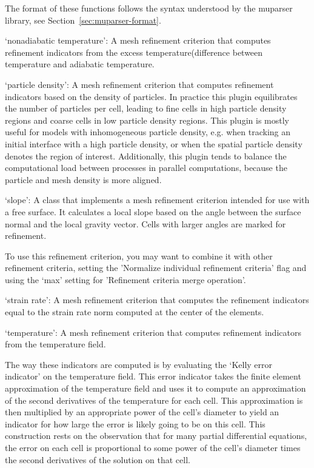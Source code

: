 \begin{itemize}
The format of these functions follows the syntax understood by the muparser library, see Section~\ref{sec:muparser-format}.

`nonadiabatic temperature': A mesh refinement criterion that computes refinement indicators from the excess temperature(difference between temperature and adiabatic temperature.

`particle density': A mesh refinement criterion that computes refinement indicators based on the density of particles. In practice this plugin equilibrates the number of particles per cell, leading to fine cells in high particle density regions and coarse cells in low particle density regions. This plugin is mostly useful for models with inhomogeneous particle density, e.g. when tracking an initial interface with a high particle density, or when the spatial particle density denotes the region of interest. Additionally, this plugin tends to balance the computational load between processes in parallel computations, because the particle and mesh density is more aligned.

`slope': A class that implements a mesh refinement criterion intended for use with a free surface. It calculates a local slope based on the angle between the surface normal and the local gravity vector. Cells with larger angles are marked for refinement.

To use this refinement criterion, you may want to combine it with other refinement criteria, setting the 'Normalize individual refinement criteria' flag and using the `max' setting for 'Refinement criteria merge operation'.

`strain rate': A mesh refinement criterion that computes the refinement indicators equal to the strain rate norm computed at the center of the elements.

`temperature': A mesh refinement criterion that computes refinement indicators from the temperature field.

The way these indicators are computed is by evaluating the `Kelly error indicator' on the temperature field. This error indicator takes the finite element approximation of the temperature field and uses it to compute an approximation of the second derivatives of the temperature for each cell. This approximation is then multiplied by an appropriate power of the cell's diameter to yield an indicator for how large the error is likely going to be on this cell. This construction rests on the observation that for many partial differential equations, the error on each cell is proportional to some power of the cell's diameter times the second derivatives of the solution on that cell.


\end{itemize}
